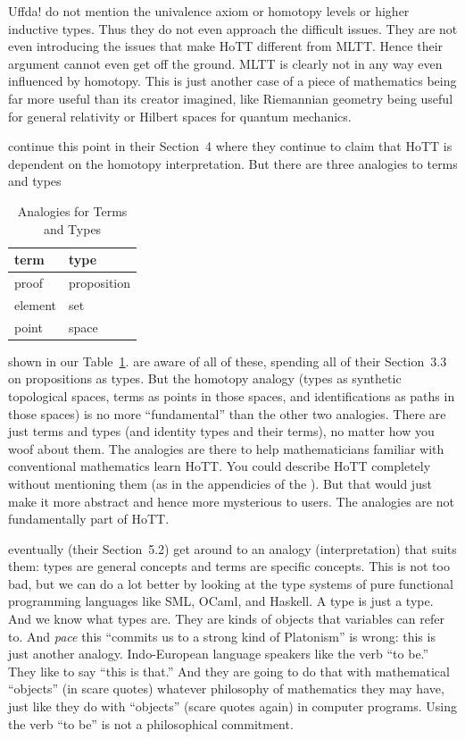 \documentclass[11pt]{article}
\begin{document}
Uffda!  \citet{ladyman-presnell-foundations} do not mention the univalence
axiom or homotopy levels or higher inductive types.  Thus they do not even
approach the difficult issues.
They are not even introducing the issues that make HoTT different from MLTT.
Hence their argument cannot even get off the ground.  MLTT is clearly not
in any way even influenced by homotopy.  This is just another case of
a piece of mathematics being far more useful than its creator imagined,
like Riemannian geometry being useful for general relativity or Hilbert spaces
for quantum mechanics.

\citet{ladyman-presnell-foundations} continue this point in their Section~4
where they continue to claim that HoTT is dependent on the homotopy
interpretation.  But there are three analogies to terms and types
\begin{table}
\caption{Analogies for Terms and Types}
\label{tab:term-type}
\begin{center}
\begin{tabular}{ll}
term & type \\
\hline
proof & proposition \\
element & set \\
point & space
\end{tabular}
\end{center}
\end{table}
shown in our Table~\ref{tab:term-type}.  \citet{ladyman-presnell-foundations}
are aware of all of these, spending all of their Section~3.3 on propositions
as types.  But the homotopy analogy (types as synthetic topological spaces,
terms as points in those spaces, and identifications as paths in those spaces)
is no more ``fundamental'' than the other two analogies.  There are just
terms and types (and identity types and their terms),
no matter how you woof about them.  The analogies are there
to help mathematicians familiar with conventional mathematics learn HoTT.
You could describe HoTT completely without mentioning them (as in the
appendicies of the ).  But that would just make it more
abstract and hence more mysterious to users.  The analogies are not
fundamentally part of HoTT.

\citet{ladyman-presnell-foundations} eventually (their Section~5.2) get
around to an analogy (interpretation) that suits them: types are general
concepts and terms are specific concepts.  This is not too bad, but we
can do a lot better by looking at the type systems of pure functional
programming languages like SML, OCaml, and Haskell.  A type is just a type.
And we know what types are.  They are kinds of objects that variables can
refer to.  And \emph{pace} \citet[Section~5.1]{ladyman-presnell-foundations}
this ``commits us to a strong kind of Platonism'' is wrong: this is just
another
analogy.  Indo-European language speakers like the verb ``to be.''  They like
to say ``this is that.''  And they are going to do that with mathematical
``objects'' (in scare quotes) whatever philosophy of mathematics they
may have, just like they do with ``objects'' (scare quotes again)
in computer programs.  Using the verb ``to be'' is not a philosophical
commitment.
\end{document}
